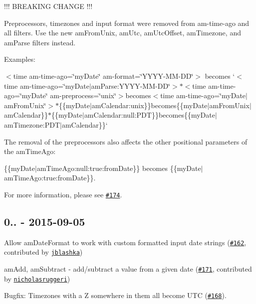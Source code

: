 !!! B\+R\+E\+A\+K\+I\+NG C\+H\+A\+N\+GE !!!

Preprocessors, timezones and input format were removed from am-\/time-\/ago and all filters. Use the new {\ttfamily am\+From\+Unix}, {\ttfamily am\+Utc}, {\ttfamily am\+Utc\+Offset}, {\ttfamily am\+Timezone}, and {\ttfamily am\+Parse} filters instead.

Examples\+:
\begin{DoxyItemize}
\item {\ttfamily $<$time am-\/time-\/ago=\char`\"{}my\+Date\char`\"{} am-\/format=\char`\"{}\+Y\+Y\+Y\+Y-\/\+M\+M-\/\+D\+D\char`\"{}$>$} becomes `$<$time am-\/time-\/ago=\char`\"{}my\+Date$\vert$am\+Parse\+:\textquotesingle{}\+Y\+Y\+Y\+Y-\/\+M\+M-\/\+D\+D\textquotesingle{}\char`\"{}$>${\ttfamily  $\ast$}$<$time am-\/time-\/ago=\char`\"{}my\+Date\char`\"{} am-\/preprocess=\char`\"{}unix\char`\"{}$>${\ttfamily becomes}$<$time am-\/time-\/ago=\char`\"{}my\+Date$\vert$am\+From\+Unix\char`\"{}$>${\ttfamily  $\ast$}\{\{my\+Date$\vert$am\+Calendar\+:\textquotesingle{}unix\textquotesingle{}\}\}{\ttfamily becomes}\{\{my\+Date$\vert$am\+From\+Unix$\vert$am\+Calendar\}\}{\ttfamily  $\ast$}\{\{my\+Date$\vert$am\+Calendar\+:null\+:\textquotesingle{}P\+DT\textquotesingle{}\}\}{\ttfamily becomes}\{\{my\+Date$\vert$am\+Timezone\+:\textquotesingle{}P\+DT\textquotesingle{}$\vert$am\+Calendar\}\}`
\end{DoxyItemize}

The removal of the preprocessors also affects the other positional parameters of the {\ttfamily am\+Time\+Ago}\+:

{\ttfamily \{\{my\+Date$\vert$am\+Time\+Ago\+:null\+:true\+:from\+Date\}\}} becomes {\ttfamily \{\{my\+Date$\vert$am\+Time\+Ago\+:true\+:from\+Date\}\}}.

For more information, please see \href{https://github.com/urish/angular-moment/issues/174}{\tt \#174}.

\subsection*{0.. -\/ 2015-\/09-\/05}


\begin{DoxyItemize}
\item Allow {\ttfamily am\+Date\+Format} to work with custom formatted input date strings (\href{https://github.com/urish/angular-moment/pull/162}{\tt \#162}, contributed by \href{https://github.com/jblashka}{\tt jblashka})
\item {\ttfamily am\+Add}, {\ttfamily am\+Subtract} -\/ add/subtract a value from a given date (\href{https://github.com/urish/angular-moment/pull/171}{\tt \#171}, contributed by \href{https://github.com/nicholasruggeri}{\tt nicholasruggeri})
\item Bugfix\+: Timezones with a \textquotesingle{}Z\textquotesingle{} somewhere in them all become U\+TC (\href{https://github.com/urish/angular-moment/issues/168}{\tt \#168}).
\end{DoxyItemize}

